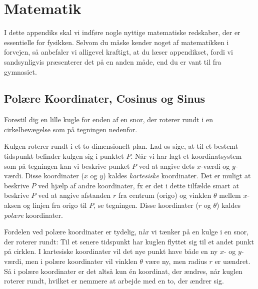 \chapter{Matematik}
\label{cha:matematik}

I dette appendiks skal vi indføre nogle nyttige matematiske redskaber,
der er essentielle for fysikken. Selvom du måske kender noget af
matematikken i forvejen, så anbefaler vi alligevel kraftigt, at du
læser appendikset, fordi vi sandsynligvis præsenterer det på en anden
måde, end du er vant til fra gymnasiet.

\section{Polære Koordinater, Cosinus og Sinus}
Forestil dig en lille kugle for enden af en snor, der roterer rundt i
en cirkelbevægelse som på tegningen nedenfor.
\begin{center}
\end{center}
Kulgen roterer rundt i et to-dimensionelt plan. Lad os sige, at til et
bestemt tidspunkt befinder kulgen sig i punktet $P$. Når vi har lagt
et koordinatsystem som på tegningen kan vi beskrive punket $P$ ved at
angive dets $x$-værdi og $y$-værdi. Disse koordinater ($x$ og $y$)
kaldes \emph{kartesiske} koordinater. Det er muligt at beskrive $P$
ved hjælp af andre koordinater, fx er det i dette tilfælde smart at
beskrive $P$ ved at angive afstanden $r$ fra centrum (origo) og
vinklen $\theta$ mellem $x$-aksen og linjen fra origo til $P$, se
tegningen. Disse koordinater ($r$ og $\theta$) kaldes \emph{polære}
koordinater.

Fordelen ved polære koordinater er tydelig, når vi tænker
på en kulge i en snor, der roterer rundt: Til et senere tidspunkt har
kuglen flyttet sig til et andet punkt på cirklen. I kartesiske
koordinater vil det nye punkt have både en ny $x$- og $y$-værdi, men i
polære koordinater vil vinklen $\theta$ være ny, men radius $r$ er
uændret. Så i polære koordinater er det altså kun én koordinat, der
ændres, når kuglen roterer rundt, hvilket er nemmere at arbejde med en
to, der ændrer sig.

